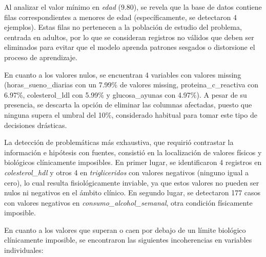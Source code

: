 \documentclass[journal,onecolumn]{IEEEtran}
\begin{document}
Al analizar el valor mínimo en \textit{edad} (9.80), se revela que la base de datos contiene filas correspondientes a menores de edad (específicamente, se detectaron 4 ejemplos). Estas filas no pertenecen a la población de estudio del problema, centrada en adultos, por lo que se consideran registros no válidos que deben ser eliminados para evitar que el modelo aprenda patrones sesgados o distorsione el proceso de aprendizaje.

En cuanto a los valores nulos, se encuentran 4 variables con valores missing (horas\_sueno\_diarias con un 7.99\% de valores missing, proteina\_c\_reactiva con 6.97\%, colesterol\_ldl con 5.99\% y glucosa\_ayunas con 4.97\%). A pesar de su presencia, se descarta la opción de eliminar las columnas afectadas, puesto que ninguna supera el umbral del 10\%, considerado habitual para tomar este tipo de decisiones drásticas.

La detección de problemáticas más exhaustiva, que requirió contrastar la información e hipótesis con fuentes, consistió en la localización de valores físicos y biológicos clínicamente imposibles. En primer lugar, se identificaron 4 registros en \textit{colesterol\_hdl} y otros 4 en \textit{trigliceridos} con valores negativos (ninguno igual a cero), lo cual resulta fisiológicamente inviable, ya que estos valores no pueden ser nulos ni negativos en el ámbito clínico. En segundo lugar, se detectaron 177 casos con valores negativos en \textit{consumo\_alcohol\_semanal}, otra condición físicamente imposible.

En cuanto a los valores que superan o caen por debajo de un límite biológico clínicamente imposible, se encontraron las siguientes incoherencias en variables individuales:
\end{document}
